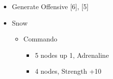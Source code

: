 	\begin{menu}
		\begin{itemize}
			\paradigm
			\begin{itemize}
				\item Generate Offensive [6], [5]
			\end{itemize}
			\crystarium
			\begin{itemize}
				\item Snow
				      \begin{itemize}
					      \item Commando
					            \begin{itemize}
						            \item 5 nodes up 1, Adrenaline
						            \item 4 nodes, Strength +10
					            \end{itemize}
				      \end{itemize}
			\end{itemize}
		\end{itemize}
	\end{menu}
	\vfill
	\renewcommand{\first}{[1] Slash \& Burn (\com/\rav)}
	\renewcommand{\second}{[2] War \& Peace (\com/\med)}
	\renewcommand{\fifth}{[5] Dualcasting (\rav/\rav)}
	\renewcommand{\sixth}{[6] Dualcasting (\rav/\rav)}
